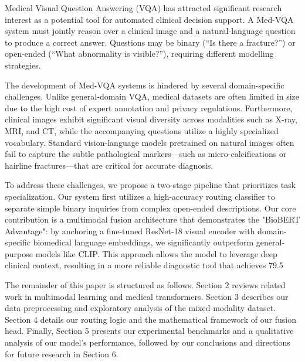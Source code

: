 \documentclass{article}
\begin{document}
Medical Visual Question Answering (VQA) has attracted significant research
interest as a potential tool for automated clinical decision support. A Med-VQA
system must jointly reason over a clinical image and a natural-language question
to produce a correct answer. Questions may be binary (``Is there a fracture?'')
or open-ended (``What abnormality is visible?''), requiring different modelling
strategies.

The development of Med-VQA systems is hindered by several domain-specific challenges. Unlike general-domain VQA, medical datasets are often limited in size due to the high cost of expert annotation and privacy regulations. Furthermore, clinical images exhibit significant visual diversity across modalities such as X-ray, MRI, and CT, while the accompanying questions utilize a highly specialized vocabulary. Standard vision-language models pretrained on natural images often fail to capture the subtle pathological markers—such as micro-calcifications or hairline fractures—that are critical for accurate diagnosis.

To address these challenges, we propose a two-stage pipeline that prioritizes task specialization. Our system first utilizes a high-accuracy routing classifier to separate simple binary inquiries from complex open-ended descriptions. Our core contribution is a multimodal fusion architecture that demonstrates the "BioBERT Advantage": by anchoring a fine-tuned ResNet-18 visual encoder with domain-specific biomedical language embeddings, we significantly outperform general-purpose models like CLIP. This approach allows the model to leverage deep clinical context, resulting in a more reliable diagnostic tool that achieves 79.5%

The remainder of this paper is structured as follows. Section 2 reviews related work in multimodal learning and medical transformers. Section 3 describes our data preprocessing and exploratory analysis of the mixed-modality dataset. Section 4 details our routing logic and the mathematical framework of our fusion head. Finally, Section 5 presents our experimental benchmarks and a qualitative analysis of our model's performance, followed by our conclusions and directions for future research in Section 6.


\end{document}
